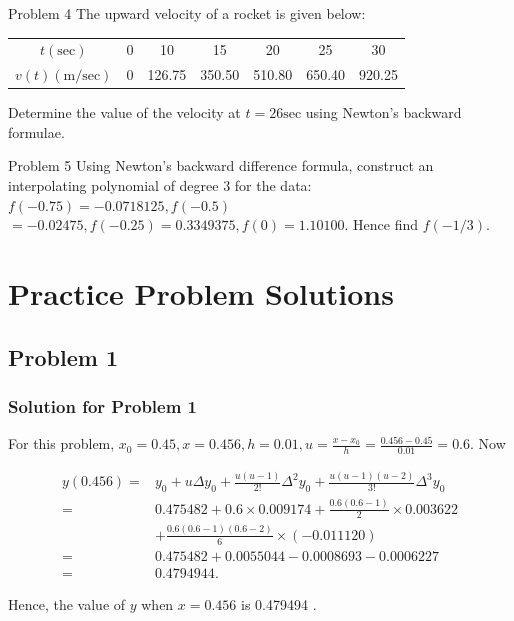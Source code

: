 \documentclass{beamer}
\begin{document}
\begin{frame}{}
\begin{block}{Problem 4}
The upward velocity of a rocket is given below:

\begin{center}
\begin{tabular}{|c|c|c|c|c|c|c|}
\hline
$t(\mathrm{sec})$ & 0 & 10 & 15 & 20 & 25 & 30 \\
$v(t)(\mathrm{m} / \mathrm{sec})$ & 0 & 126.75 & 350.50 & 510.80 & 650.40 & 920.25 \\
\hline
\end{tabular}
\end{center}
Determine the value of the velocity at $t=26 \mathrm{sec}$ using Newton's backward formulae.
\end{block}
\begin{block}{Problem 5}
Using Newton's backward difference formula, construct an interpolating polynomial of degree 3 for the data: $f(-0.75)=-0.0718125, f(-0.5)$ $=-0.02475, f(-0.25)=0.3349375, f(0)=1.10100$. Hence find $f(-1 / 3)$.
\end{block}
\end{frame}
\section{Practice Problem Solutions}
\subsection{Problem 1}
\begin{frame}
\frametitle{Solution for Problem 1}
For this problem, $x_{0}=0.45, x=0.456, h=0.01, u=\frac{x-x_{0}}{h}=\frac{0.456-0.45}{0.01}=0.6$. Now

$$
\begin{aligned}
y(0.456)= & y_{0}+u \Delta y_{0}+\frac{u(u-1)}{2 !} \Delta^{2} y_{0}+\frac{u(u-1)(u-2)}{3 !} \Delta^{3} y_{0} \\
= & 0.475482+0.6 \times 0.009174+\frac{0.6(0.6-1)}{2} \times 0.003622 \\
& +\frac{0.6(0.6-1)(0.6-2)}{6} \times(-0.011120) \\
= & 0.475482+0.0055044-0.0008693-0.0006227 \\
= & 0.4794944 .
\end{aligned}
$$

Hence, the value of $y$ when $x=0.456$ is 0.479494 .
\end{frame}
\end{document}
